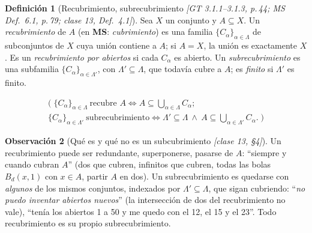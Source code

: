 \documentclass[11pt,a4paper]{article}
\newcommand{\lgc}[1]{\par\vspace{-3pt}\begin{gather*}\big(\;#1\;\big)\end{gather*}\vspace{-6pt}}
\newcommand{\figtit}[1]{\par\vspace{2pt}{\footnotesize\itshape #1}\par}
\theoremstyle{definition}
\newtheorem{definicion}{Definición}[section]
\newtheorem{observacion}[definicion]{Observación}
\theoremstyle{plain}
\newcommand{\fnt}[1]{{\normalfont\small\itshape\color{gray!150!black}[#1]}}
\newcommand{\Bola}[2]{B_d(#1,#2)}
\begin{document}
\begin{definicion}[Recubrimiento, subrecubrimiento \fnt{GT 3.1.1--3.1.3, p.\,44; MS Def.\ 6.1, p.\,79; clase 13, Def.\ 4.1}]
Sea $X$ un conjunto y $A\subseteq X$. Un \emph{recubrimiento} de $A$ (en \textbf{MS}: \emph{cubrimiento}) es una familia $\{C_\alpha\}_{\alpha\in\Lambda}$ de subconjuntos de $X$ cuya unión contiene a $A$; si $A=X$, la unión es exactamente $X$. Es un \emph{recubrimiento por abiertos} si cada $C_\alpha$ es abierto. Un \emph{subrecubrimiento} es una subfamilia $\{C_\alpha\}_{\alpha\in\Lambda'}$, con $\Lambda'\subseteq\Lambda$, que todavía cubre a $A$; es \emph{finito} si $\Lambda'$ es finito.
\lgc{\{C_\alpha\}_{\alpha\in\Lambda}\ \text{recubre } A\iff A\subseteq\textstyle\bigcup_{\alpha\in\Lambda}C_\alpha;\\
\{C_\alpha\}_{\alpha\in\Lambda'}\ \text{subrecubrimiento}\iff \Lambda'\subseteq\Lambda\ \wedge\ A\subseteq\textstyle\bigcup_{\alpha\in\Lambda'}C_\alpha.}
\end{definicion}

\begin{observacion}[Qué es y qué no es un subcubrimiento \fnt{clase 13, \S4}]
Un recubrimiento puede ser redundante, superponerse, pasarse de $A$: ``siempre y cuando cubran $A$'' (dos que cubren, infinitos que cubren, todas las bolas $\Bola{x}{1}$ con $x\in A$, partir $A$ en dos). Un subrecubrimiento es quedarse con \emph{algunos} de los mismos conjuntos, indexados por $\Lambda'\subseteq\Lambda$, que sigan cubriendo: ``\emph{no puedo inventar abiertos nuevos}'' (la intersección de dos del recubrimiento no vale), ``tenía los abiertos 1 a 50 y me quedo con el 12, el 15 y el 23''. Todo recubrimiento es su propio subrecubrimiento.
\end{observacion}

\begin{figure}[ht]
\centering
{}
\figtit{Figura 30. Recubrimiento y subrecubrimiento, como en la pizarra de la clase 13: se eligen algunos de los mismos abiertos, sin inventar nuevos.}
\end{figure}
\end{document}
